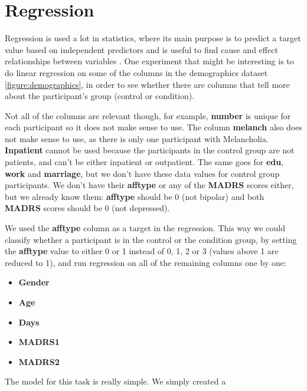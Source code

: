 
\section{Regression}

Regression is used a lot in statistics, where its main purpose is to predict a target value based on independent predictors and is useful to find cause and effect 
relationships between variables \cite{linear_regression_ml}. One experiment that might be interesting is to do linear regression on some of the columns in the demographics dataset 
\ref{figure:demographics}, in order to see whether there are columns that tell more about the participant's group (control or condition).  

Not all of the columns are relevant though, for example, \textbf{number} is unique for each participant so it does not make sense to use. 
The column \textbf{melanch} also does not make sense to use, as there is only one participant with Melancholia. 
\textbf{Inpatient} cannot be used because the participants in the control group are not patients, and can't be either inpatient or outpatient. 
The same goes for \textbf{edu}, \textbf{work} and \textbf{marriage}, but we don't have these data values for control group participants. 
We don't have their \textbf{afftype} or any of the \textbf{MADRS} scores either, but we already know them: \textbf{afftype} should be 0 (not bipolar) 
and both \textbf{MADRS} scores should be 0 (not depressed). 

We used the \textbf{afftype} column as a target in the regression. This way we could classify whether a participant is in the control or the condition group, 
by setting the \textbf{afftype} value to either 0 or 1 instead of 0, 1, 2 or 3 (values above 1 are reduced to 1), and run regression on all of the remaining 
columns one by one:

\begin{itemize}
      \item \textbf{Gender}
      \item \textbf{Age}
      \item \textbf{Days}
      \item \textbf{MADRS1}
      \item \textbf{MADRS2}
\end{itemize}



The model for this task is really simple. We simply created a

